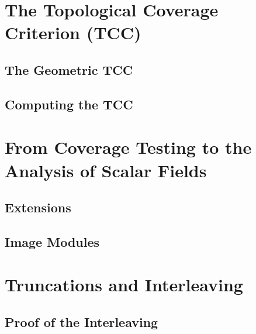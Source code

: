 \documentclass[12pt]{article}
\begin{document}
\clearpage
\section{The Topological Coverage Criterion (TCC)}


\clearpage



\subsection{The Geometric TCC}\label{sec:geometric}


\subsection{Computing the TCC}
  


\clearpage
\section{From Coverage Testing to the Analysis of Scalar Fields}\label{sec:middle}
%


\subsection{Extensions}
  

\subsection{Image Modules}


\clearpage
\section{Truncations and Interleaving}\label{sec:interleaving}




\subsection{Proof of the Interleaving}
  
\end{document}
